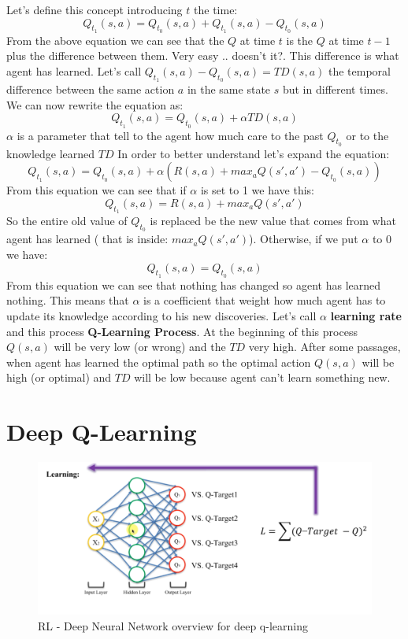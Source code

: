 Let's define this concept introducing $t$ the time:
\begin{equation}
Q_{t_1}(s,a) = Q_{t_0}(s,a) + { Q_{t_1}(s,a) - Q_{t_0}(s,a) }
\end{equation} 
From the above equation we can see that the $Q$ at time $t$ is the $Q$ at time $t-1$ plus the difference between them. Very easy .. doesn't it?. This difference is what agent has learned.
Let's call $Q_{t_1}(s,a) - Q_{t_0}(s,a) = TD(s,a)$ the temporal difference between the same action $a$ in the same state $s$ but in different times. We can now rewrite the equation as:
\begin{equation}
Q_{t_1}(s,a) = Q_{t_0}(s,a) +\alpha TD(s,a)
\end{equation}
$\alpha$ is a parameter that tell to the agent how much care to the past $Q_{t_0}$ or to the knowledge learned $TD$
In order to better understand let's expand the equation:
\begin{equation}
Q_{t_1}(s,a) = Q_{t_0}(s,a) + \alpha(R(s,a) + max_a Q(s',a') - Q_{t_0}(s,a))
\end{equation}
From this equation we can see that if $\alpha$ is set to 1 we have this:
\begin{equation}
Q_{t_1}(s,a) = R(s,a) + max_a Q(s',a')
\end{equation}
So the entire old value of $Q_{t_0}$ is replaced be the new value that comes from what agent has learned ( that is inside: $max_a Q(s',a')$). Otherwise, if we put $\alpha$ to 0 we 
 have:
 \begin{equation}
Q_{t_1}(s,a) = Q_{t_0}(s,a)
\end{equation}
From this equation we can see that nothing has changed so agent has learned nothing. This means that $\alpha$ is a coefficient that weight how much agent has to update its knowledge according to his new discoveries. Let's call $\alpha$ \textbf{learning rate} and this process \textbf{Q-Learning Process}. At the beginning of this process $Q(s,a)$ will be very low (or wrong) and the $TD$ very high. After some passages, when agent has learned the optimal path so the optimal action $Q(s,a)$ will be high (or optimal) and $TD$ will be low because agent can't learn something new.

\section{Deep Q-Learning}
\begin{figure}
    \centering
    \includegraphics[scale=0.45]{img/rl-deepql1.png}
    \caption{RL - Deep Neural Network overview for deep q-learning}
    \label{img:RL-deep-ql}
\end{figure}

